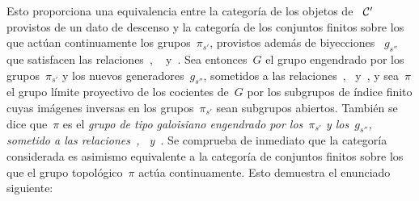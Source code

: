 Esto proporciona una equivalencia entre la categoría de los objetos de
~$\cal{C}'$ provistos de un
dato de descenso y la categoría de los conjuntos finitos sobre los que actúan
continuamente los grupos~$\pi_{s'}$, provistos además de biyecciones
~$g_{s''}$ que satisfacen las relaciones~,
~ y~. Sea entonces~$G$ el grupo engendrado por
los grupos~$\pi_{s'}$ y los nuevos generadores~$g_{s''}$, sometidos a las
relaciones~,~ y~, y sea~$\pi$
el grupo límite proyectivo de los cocientes de~$G$ por los subgrupos de índice
finito cuyas imágenes inversas en los grupos~$\pi_{s'}$ sean subgrupos
abiertos. También se dice que~$\pi$ es el \emph{grupo de tipo galoisiano
engendrado por los~$\pi_{s'}$ y los~$g_{s''}$, sometido a las
relaciones~,~ y~}. Se comprueba
de inmediato que la categoría considerada es asimismo equivalente a la
categoría de conjuntos finitos sobre los que el grupo topológico~$\pi$ actúa
continuamente. Esto demuestra el enunciado siguiente:
